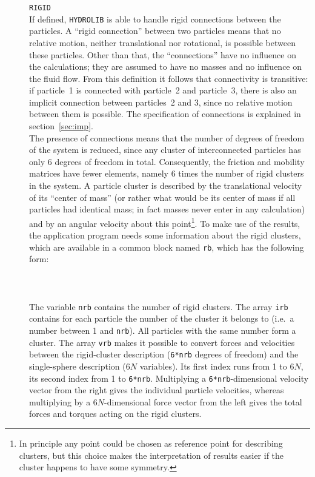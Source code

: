 \documentclass[12pt]{article}
\newcommand{\prog}[1]{{\tt #1}}
\newcommand{\wsp}{\hspace*{0.5cm}}
\begin{document}
\begin{description}
\item[]
\prog{RIGID}\\
If defined, \prog{HYDROLIB} is able to handle
rigid connections between the particles. A ``rigid connection'' between
two particles means that no relative motion, neither translational nor
rotational, is possible between these particles. Other than that, the
``connections'' have no influence on the calculations; they are assumed
to have no masses and no influence on the fluid flow. From this definition it
follows that connectivity is transitive: if particle~1 is connected with
particle~2 and particle~3, there is also an implicit connection between
particles~2 and 3, since no relative motion between them is possible.
The specification of connections is explained in section~\ref{sec:imp}.\\
The presence of connections means that the number of degrees of freedom
of the system is reduced, since any cluster of interconnected particles
has only 6 degrees of freedom in total. Consequently, the friction and
mobility matrices have fewer elements, namely 6 times the number of
rigid clusters in the system. A particle cluster is described by the
translational velocity of its ``center of mass'' (or rather what would
be its center of mass if all particles had identical mass; in fact masses
never enter in any calculation) and by an angular velocity about this
point\footnote{In principle any point could be chosen as reference
point for describing clusters, but this choice makes the interpretation
of results easier if the cluster happens to have some symmetry.}.
To make use of the results, the application program needs some information
about the rigid clusters, which are available in a common block named
\prog{rb}, which has the following form:\\
\wsp\prog{real vrb(6*\_NP\_,6*\_NP\_)}\\
\wsp\prog{integer nrb,irb(\_NP\_)}\\
\wsp\prog{common /rb/ vrb,nrb,irb}\\
The variable \prog{nrb} contains the number of rigid clusters. The
array \prog{irb} contains for each particle the number of the cluster
it belongs to (i.e.\ a number between 1 and \prog{nrb}). All particles
with the same number form a cluster. The array \prog{vrb} makes it
possible to convert forces and velocities between the rigid-cluster
description (\prog{6*nrb} degrees of freedom) and the single-sphere
description (6$N$ variables). Its first index runs from 1 to $6N$, its
second index from 1 to \prog{6*nrb}. Multiplying a \prog{6*nrb}-dimensional
velocity vector from the right gives the individual particle velocities,
whereas multiplying by a 6$N$-dimensional force vector from the left gives
the total forces and torques acting on the rigid clusters.\\


\end{description}
\end{document}
